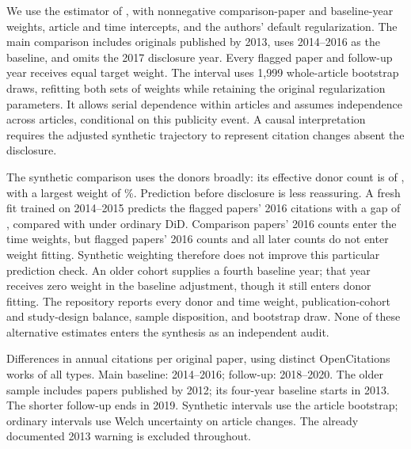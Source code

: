 \documentclass[11pt,letterpaper]{article}
\begin{document}
We use the estimator of \citet{arkhangelsky2021}, with nonnegative comparison-paper and baseline-year weights, article and time intercepts, and the authors' default regularization. The main comparison includes originals published by 2013, uses 2014--2016 as the baseline, and omits the 2017 disclosure year. Every flagged paper and follow-up year receives equal target weight. The interval uses 1,999 whole-article bootstrap draws, refitting both sets of weights while retaining the original regularization parameters. It allows serial dependence within articles and assumes independence across articles, conditional on this publicity event. A causal interpretation requires the adjusted synthetic trajectory to represent citation changes absent the disclosure.

The synthetic comparison uses the donors broadly: its effective donor count is \LazicSdidDonors{} of \LazicSdidControls{}, with a largest weight of \LazicSdidMaxWeight\%. Prediction before disclosure is less reassuring. A fresh fit trained on 2014--2015 predicts the flagged papers' 2016 citations with a gap of \mbox{\LazicSdidPlacebo}, compared with \mbox{\LazicSdidPlaceboDid} under ordinary DiD. Comparison papers' 2016 counts enter the time weights, but flagged papers' 2016 counts and all later counts do not enter weight fitting. Synthetic weighting therefore does not improve this particular prediction check. An older cohort supplies a fourth baseline year; that year receives zero weight in the baseline adjustment, though it still enters donor fitting. The repository reports every donor and time weight, publication-cohort and study-design balance, sample disposition, and bootstrap draw. None of these alternative estimates enters the synthesis as an independent audit.

\begin{table}[htbp]
\centering
\caption{Citation changes after the pseudoreplication audit: synthetic and ordinary DiD}
\label{tab:lazic-sdid}
\scriptsize

\par\smallskip
\begin{minipage}{\linewidth}\footnotesize
Differences in annual citations per original paper, using distinct OpenCitations works of all types. Main baseline: 2014--2016; follow-up: 2018--2020. The older sample includes papers published by 2012; its four-year baseline starts in 2013. The shorter follow-up ends in 2019. Synthetic intervals use the article bootstrap; ordinary intervals use Welch uncertainty on article changes. The already documented 2013 warning is excluded throughout.
\end{minipage}
\end{table}
\end{document}
